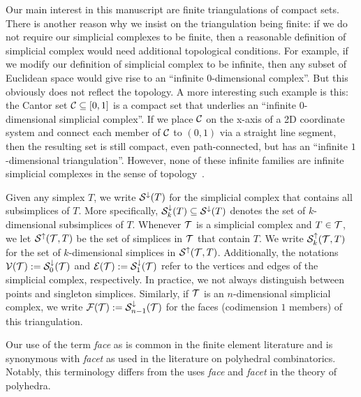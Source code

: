 \documentclass[a4paper]{article}
\begin{document}
\begin{remark}
    Our main interest in this manuscript are finite triangulations of compact sets. 
    There is another reason why we insist on the triangulation being finite: 
    if we do not require our simplicial complexes to be finite,
    then a reasonable definition of simplicial complex would need additional topological conditions. 
    For example, if we modify our definition of simplicial complex to be infinite, 
    then any subset of Euclidean space would give rise to an ``infinite $0$-dimensional complex''. But this obviously does not reflect the topology. 
    A more interesting such example is this:
    the Cantor set ${\mathcal C} \subseteq [0,1]$ is a compact set 
    that underlies an ``infinite $0$-dimensional simplicial complex''.
    If we place ${\mathcal C}$ on the x-axis of a 2D coordinate system 
    and connect each member of ${\mathcal C}$ to $(0,1)$ via a straight line segment, 
    then the resulting set is still compact, even path-connected,  
    but has an ``infinite $1$-dimensional triangulation''.
    However, none of these infinite families are infinite simplicial complexes in the sense of topology~\cite{spanier1966homology}. 
\end{remark}


Given any simplex $T$, we write ${\mathcal S}^{\downarrow}(T)$ for the simplicial complex that contains all subsimplices of $T$. 
More specifically, ${\mathcal S}^{\downarrow}_{{k}}(T) \subseteq {\mathcal S}^{\downarrow}(T)$ denotes the set of $k$-dimensional subsimplices of $T$. 
Whenever ${\mathcal T}$ is a simplicial complex and $T \in {\mathcal T}$, we let ${\mathcal S}^{\uparrow}({\mathcal T},T)$ be the set of simplices in ${\mathcal T}$ that contain $T$.
We write ${\mathcal S}^{\uparrow}_{k}({\mathcal T},T)$ for the set of $k$-dimensional simplices in ${\mathcal S}^{\uparrow}({\mathcal T},T)$. 
Additionally, the notations ${\mathcal V}({\mathcal T}) := {\mathcal S}^{\downarrow}_{0}({\mathcal T})$ and ${\mathcal E}({\mathcal T}) := {\mathcal S}^{\downarrow}_{1}({\mathcal T})$ refer to the vertices and edges of the simplicial complex, respectively. 
In practice, we not always distinguish between points and singleton simplices. %
Similarly, if ${\mathcal T}$ is an $n$-dimensional simplicial complex, we write ${\mathcal F}({\mathcal T}) := {\mathcal S}^{\downarrow}_{n-1}({\mathcal T})$ for the faces (codimension $1$ members) of this triangulation. 

\begin{remark}
    Our use of the term \textit{face} as is common in the finite element literature
    and is synonymous with \textit{facet} as used in the literature on polyhedral combinatorics.
    Notably, this terminology differs from the uses \textit{face} and \textit{facet} in the theory of polyhedra. 
\end{remark}
\end{document}
